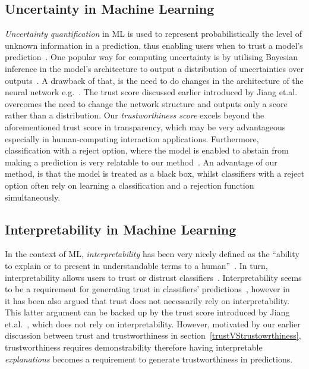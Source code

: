\subsection{Uncertainty in Machine Learning}
\textit{Uncertainty quantification} in ML is used to represent probabilistically the level of unknown information in a prediction, thus enabling users when to trust a model's prediction~\cite{ghahramani2015probabilistic}\cite{tran2022plex}.
%
One popular way for computing uncertainty is by utilising Bayesian inference in the model's architecture to output a distribution of uncertainties over outputs~\cite{gal2016dropout}\cite{ABDAR2021}. 
%
A drawback of that, is the need to do changes in the architecture of the neural network e.g.~\cite{Kraus2019}.
%
The trust score discussed earlier introduced by Jiang et.al. ~\cite{Jiang2018} overcomes the need to change the network structure and outputs only a score rather than a distribution.
%
Our \textit{trustworthiness score} excels beyond the aforementioned trust score in transparency, which may be very advantageous especially in human-computing interaction applications. 
%
Furthermore, classification with a reject option, where the model is enabled to abstain from making a prediction is very relatable to our method~\cite{hendrickx2021machine}. 
%
An advantage of our method, is that the model is treated as a black box, whilst classifiers with a reject option often rely on learning a classification and a rejection function simultaneously. 


\subsection{Interpretability in Machine Learning}
In the context of ML, \textit{interpretability} has been very nicely defined as the ``ability to explain or to present in understandable terms to a human''~\cite{Doshi-Velez2017}. 
%
In turn, interpretability allows users to trust or distrust classifiers~\cite{Rudin2022}. 
%
Interpretability seems to be a requirement for generating trust in classifiers' predictions~\cite{Ribeiro2016, Lipton2018}, however in ~\cite{Lipton2018} it has been also argued that trust does not necessarily rely on interpretability. This latter argument can be backed up by the trust score introduced by Jiang et.al.~\cite{Jiang2018}, which does not rely on interpretability. 
%
However, motivated by our earlier discussion between trust and trustworthiness in section~\ref{trustVStrustowrthiness}, trustworthiness requires demonstrability therefore having interpretable \textit{explanations} becomes a requirement to generate trustworthiness in predictions.

